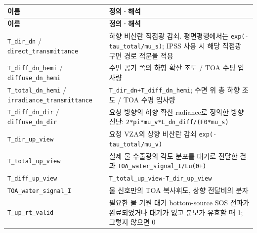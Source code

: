 {\TableFont
\begin{longtable}{@{}>{\raggedright\arraybackslash}p{}>{\raggedright\arraybackslash}p{}@{}}
\toprule
\textbf{이름} & \textbf{정의·해석} \\
\midrule
\endfirsthead
\toprule
\textbf{이름} & \textbf{정의·해석} \\
\midrule
\endhead
\bottomrule
\endfoot
\texttt{T\_\allowbreak{}dir\_\allowbreak{}dn} / \texttt{direct\_\allowbreak{}transmittance} & 하향 비산란 직접광 감쇠. 평면평행에서는 \texttt{exp(-tau\_\allowbreak{}total/\allowbreak{}mu\_\allowbreak{}s)}; IPSS 사용 시 해당 직접광 구면 경로 적분을 적용 \\
\texttt{T\_\allowbreak{}diff\_\allowbreak{}dn\_\allowbreak{}hemi} / \texttt{diffuse\_\allowbreak{}dn\_\allowbreak{}hemi} & 수면 공기 쪽의 하향 확산 조도 / TOA 수평 입사량 \\
\texttt{T\_\allowbreak{}total\_\allowbreak{}dn\_\allowbreak{}hemi} / \texttt{irradiance\_\allowbreak{}transmittance} & \texttt{T\_\allowbreak{}dir\_\allowbreak{}dn+T\_\allowbreak{}diff\_\allowbreak{}dn\_\allowbreak{}hemi}; 수면 위 총 하향 조도 / TOA 수평 입사량 \\
\texttt{T\_\allowbreak{}diff\_\allowbreak{}dn\_\allowbreak{}dir} / \texttt{diffuse\_\allowbreak{}dn\_\allowbreak{}dir} & 요청 방향의 하향 확산 radiance로 정의한 방향 진단: \texttt{2*pi*mu\_\allowbreak{}v*L\_\allowbreak{}dn\_\allowbreak{}diff/\allowbreak{}(F0*mu\_\allowbreak{}s)} \\
\texttt{T\_\allowbreak{}dir\_\allowbreak{}up\_\allowbreak{}view} & 요청 VZA의 상향 비산란 감쇠 \texttt{exp(-tau\_\allowbreak{}total/\allowbreak{}mu\_\allowbreak{}v)} \\
\texttt{T\_\allowbreak{}total\_\allowbreak{}up\_\allowbreak{}view} & 실제 물 수출광의 각도 분포를 대기로 전달한 결과 \texttt{TOA\_\allowbreak{}water\_\allowbreak{}signal\_\allowbreak{}I/\allowbreak{}Lu(0+)} \\
\texttt{T\_\allowbreak{}diff\_\allowbreak{}up\_\allowbreak{}view} & \texttt{T\_\allowbreak{}total\_\allowbreak{}up\_\allowbreak{}view-T\_\allowbreak{}dir\_\allowbreak{}up\_\allowbreak{}view} \\
\texttt{TOA\_\allowbreak{}water\_\allowbreak{}signal\_\allowbreak{}I} & 물 신호만의 TOA 복사휘도, 상향 전달비의 분자 \\
\texttt{T\_\allowbreak{}up\_\allowbreak{}rt\_\allowbreak{}valid} & 필요한 물 기원 대기 bottom-source SOS 전파가 완료되었거나 대기가 없고 분모가 유효할 때 1; 그렇지 않으면 0 \\
\end{longtable}
}

